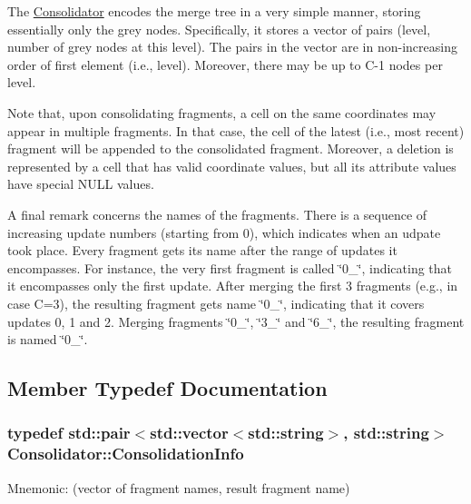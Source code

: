 The \hyperlink{classConsolidator}{Consolidator} encodes the merge tree in a very simple manner, storing essentially only the grey nodes. Specifically, it stores a vector of pairs (level, number of grey nodes at this level). The pairs in the vector are in non-\/increasing order of first element (i.\+e., level). Moreover, there may be up to C-\/1 nodes per level.

Note that, upon consolidating fragments, a cell on the same coordinates may appear in multiple fragments. In that case, the cell of the latest (i.\+e., most recent) fragment will be appended to the consolidated fragment. Moreover, a deletion is represented by a cell that has valid coordinate values, but all its attribute values have special N\+U\+L\+L values.

A final remark concerns the names of the fragments. There is a sequence of increasing update numbers (starting from 0), which indicates when an udpate took place. Every fragment gets its name after the range of updates it encompasses. For instance, the very first fragment is called \char`\"{}0\+\_\char`\"{}, indicating that it encompasses only the first update. After merging the first 3 fragments (e.\+g., in case C=3), the resulting fragment gets name \char`\"{}0\+\_\char`\"{}, indicating that it covers updates 0, 1 and 2. Merging fragments \char`\"{}0\+\_\char`\"{}, \char`\"{}3\+\_\char`\"{} and \char`\"{}6\+\_\char`\"{}, the resulting fragment is named \char`\"{}0\+\_\char`\"{}. 

\subsection{Member Typedef Documentation}
\hypertarget{classConsolidator_a1b5064df8a7673a9cda8d079838309bf}{}
\subsubsection[{Consolidation\+Info}]{\setlength{\rightskip}{0pt plus 5cm}typedef std\+::pair$<$std\+::vector$<$std\+::string$>$, std\+::string$>$ {\bf Consolidator\+::\+Consolidation\+Info}}\label{classConsolidator_a1b5064df8a7673a9cda8d079838309bf}
Mnemonic\+: (vector of fragment names, result fragment name) \hypertarget{classConsolidator_a34bc002a0189718ae47bb2e934a8300f}{}

